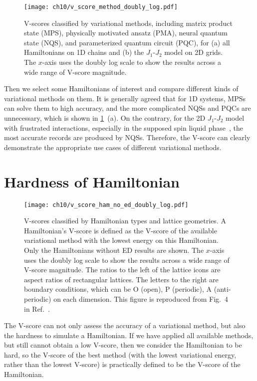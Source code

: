 \begin{figure}[htb]
\centering
\texttt{[image: ch10/v\_score\_method\_doubly\_log.pdf]}
\caption[V-scores of different methods]{
V-scores classified by variational methods, including matrix product state (MPS), physically motivated ansatz (PMA), neural quantum state (NQS), and parameterized quantum circuit (PQC), for (a) all Hamiltonians on 1D chains and (b) the $J_1$-$J_2$ model on 2D grids.
The $x$-axis uses the doubly log scale to show the results across a wide range of V-score magnitude.
}
\label{fig:v-score-method}
\end{figure}

Then we select some Hamiltonians of interest and compare different kinds of variational methods on them. It is generally agreed that for 1D systems, MPSs can solve them to high accuracy, and the more complicated NQSs and PQCs are unnecessary, which is shown in \cref{fig:v-score-method}~(a). On the contrary, for the 2D $J_1$-$J_2$ model with frustrated interactions, especially in the supposed spin liquid phase~\cite{dagotto1989phase, schulz1996magnetic, hu2013direct, liang2018solving, liu2018gapless, choo2019two, nomura2021dirac}, the most accurate records are produced by NQSs. Therefore, the V-score can clearly demonstrate the appropriate use cases of different variational methods.

\section{Hardness of Hamiltonian}

\begin{figure}[htb]
\centering
\texttt{[image: ch10/v\_score\_ham\_no\_ed\_doubly\_log.pdf]}
\caption[V-scores of different Hamiltonians]{
V-scores classified by Hamiltonian types and lattice geometries.
A Hamiltonian's V-score is defined as the V-score of the available variational method with the lowest energy on this Hamiltonian.
Only the Hamiltonians without ED results are shown.
The $x$-axis uses the doubly log scale to show the results across a wide range of V-score magnitude.
The ratios to the left of the lattice icons are aspect ratios of rectangular lattices. The letters to the right are boundary conditions, which can be O (open), P (periodic), A (anti-periodic) on each dimension.
This figure is reproduced from Fig.~4 in Ref.~\cite{wu2023variational}.
}
\label{fig:v-score-ham}
\end{figure}

The V-score can not only assess the accuracy of a variational method, but also the hardness to simulate a Hamiltonian. If we have applied all available methods, but still cannot obtain a low V-score, then we consider the Hamiltonian to be hard, so the V-score of the best method (with the lowest variational energy, rather than the lowest V-score) is practically defined to be the V-score of the Hamiltonian.

